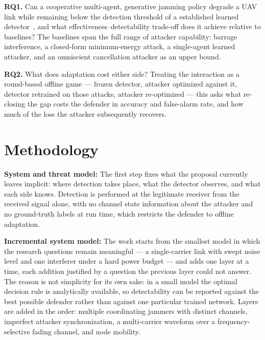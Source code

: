 \documentclass[conference]{IEEEtran}
\newcommand{\adm}[1]{{\color{orange}{[#1]}}}
\newcommand{\adm}[1]{\ignorespaces}
\begin{document}
\textbf{RQ1.} Can a cooperative multi-agent, generative jamming policy degrade a UAV link while
remaining below the detection threshold of a established learned detector~\cite{9707819}, and what effectiveness--detectability trade-off does it achieve relative to baselines?
The baselines span the full range of attacker capability: barrage interference, a closed-form minimum-energy attack, a single-agent learned attacker, and an omniscient cancellation attacker as an upper bound.

\textbf{RQ2.} What does adaptation cost either side? Treating the interaction as a round-based offline game --- frozen detector, attacker optimized against it, detector retrained on those attacks, attacker re-optimized --- this asks what re-closing the gap costs the defender in accuracy and false-alarm rate, and how much of the loss the attacker subsequently recovers.

\section{Methodology}

\adm{important: the main contrib now seems the application of some neural architecture for this problem. discussing a novelty in the neural architecture or in how defenders and attackers interact, coordinate, and syncronize within themselves could strengthen the contribution's novelty}
\textbf{System and threat model:}
The first step fixes what the proposal currently leaves implicit: where detection takes place, what the detector observes, and what each side knows.
Detection is performed at the legitimate receiver from the received signal alone, with no channel state information about the attacker and no ground-truth labels at run time, which restricts the defender to offline adaptation.

\textbf{Incremental system model:}
The work starts from the smallest model in which the research questions remain meaningful --- a single-carrier link with swept noise level and one interferer under a hard power budget --- and adds one layer at a time, each addition justified by a question the previous layer could not answer.
The reason is not simplicity for its own sake: in a small model the optimal decision rule is analytically available, so detectability can be reported against the best possible defender rather than against one particular trained network.
Layers are added in the order: multiple coordinating jammers with distinct channels, imperfect attacker synchronization, a multi-carrier waveform over a frequency-selective fading channel, and node mobility.
\end{document}
